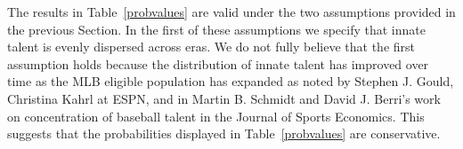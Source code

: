 \documentclass[11pt]{article}\usepackage[]{graphicx}\usepackage[]{color}
\begin{document}
The results in Table~\ref{probvalues} are valid 
under the two assumptions provided in the previous Section.  In the first of 
these assumptions we specify that innate talent is evenly dispersed across 
eras. 
We do not fully believe that the first assumption holds because the 
distribution of innate talent has improved over time as the MLB eligible  
population has expanded as noted by Stephen J. Gould,  
Christina Kahrl at ESPN, and in 
Martin B. Schmidt and David J. Berri's work on concentration of baseball 
talent in the Journal of Sports Economics.
This suggests that the probabilities displayed in Table~\ref{probvalues} are 
conservative.  %
\end{document}
